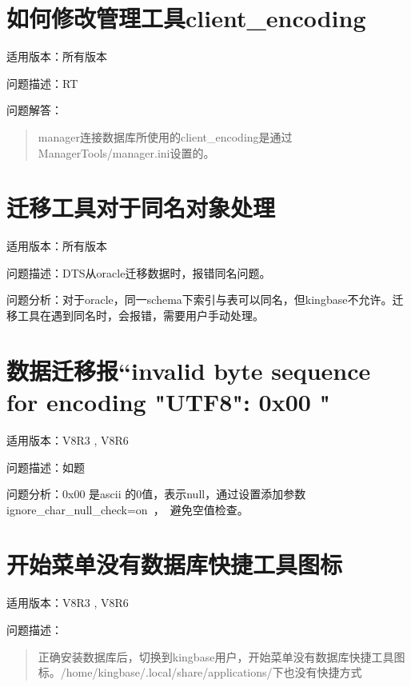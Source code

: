 \documentclass[a4,10pt,oneside,english]{sphinxmanual}
\let\sphinxpxdimen\pdfpxdimen\else\newdimen\sphinxpxdimen
\begin{document}
\section{如何修改管理工具client\_encoding}
\label{\detokenize{tools:client-encoding}}
适用版本：所有版本

问题描述：RT

问题解答：
\begin{quote}

manager连接数据库所使用的client\_encoding是通过ManagerTools/manager.ini设置的。

\begin{figure}[H]
\centering

\noindent\sphinxincludegraphics[width=510\sphinxpxdimen,height=128\sphinxpxdimen]{{FAQ29287}.png}
\end{figure}
\end{quote}


\section{迁移工具对于同名对象处理}
\label{\detokenize{tools:id2}}
适用版本：所有版本

问题描述：DTS从oracle迁移数据时，报错同名问题。

问题分析：对于oracle，同一schema下索引与表可以同名，但kingbase不允许。迁移工具在遇到同名时，会报错，需要用户手动处理。


\section{数据迁移报“invalid byte sequence for encoding "UTF8": 0x00 "}
\label{\detokenize{tools:invalid-byte-sequence-for-encoding-utf8-0x00}}
适用版本：V8R3 , V8R6

问题描述：如题

问题分析：0x00 是ascii 的0值，表示null，通过设置添加参数ignore\_char\_null\_check=on ， 避免空值检查。


\section{开始菜单没有数据库快捷工具图标}
\label{\detokenize{tools:id3}}
适用版本：V8R3 , V8R6

问题描述：
\begin{quote}

正确安装数据库后，切换到kingbase用户，开始菜单没有数据库快捷工具图标。/home/kingbase/.local/share/applications/下也没有快捷方式
\end{quote}
\end{document}
